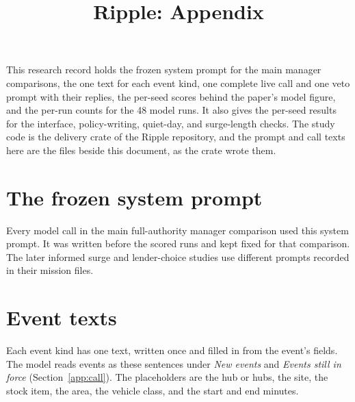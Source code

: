 \documentclass[conference]{IEEEtran}
\title{Ripple: Appendix}
\author{\IEEEauthorblockN{\strut}\IEEEauthorblockA{\strut}}
\begin{document}
\maketitle

This research record holds the frozen system prompt for the main manager
comparisons, the one text for each event kind, one complete live call and
one veto prompt with their replies, the
per-seed scores behind the paper's model figure, and the per-run counts for
the 48 model runs. It also gives the per-seed results for the interface,
policy-writing, quiet-day, and surge-length checks. The study code is the
delivery crate of the Ripple repository, and the prompt and call texts
here are the files beside this document, as the crate wrote them.

\section{The frozen system prompt}

Every model call in the main full-authority manager comparison used this
system prompt. It was written before the scored runs and kept fixed for
that comparison. The later informed surge and lender-choice studies use
different prompts recorded in their mission files.



\section{Event texts}
\label{app:events}

Each event kind has one text, written once and filled in from the event's
fields. The model reads events as these sentences under \emph{New events}
and \emph{Events still in force} (Section~\ref{app:call}). The placeholders
are the hub or hubs, the site, the stock item, the area, the vehicle class,
and the start and end minutes.
\end{document}
